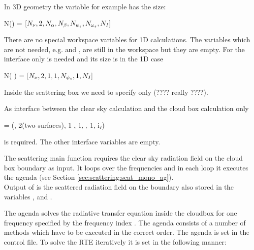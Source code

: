 In 3D geometry the variable   for example has the
size:
\begin{center}
  N() = $[N_{\nu}, 2, N_{\alpha}, N_{\beta}, N_{{\psi_s}},
  N_{{\omega_s}}, N_I]$
\end{center}  


There are no special workspace variables for 1D calculations. The
variables which are not needed, e.g.  and
, are still in the workspace but they are
empty. For the interface only  is needed and its
size is in the 1D case
\begin{center}
N(  ) = $[N_{\nu}, 2, 1, 1,  N_{{\psi_s}}, 1,  N_I]$
\end{center}  
Inside the scattering box we need to specify only  
 (???? really ????). 

As interface between the clear sky calculation and the cloud box calculation only 
  \begin{center}
   =  (\Frq, 2(two surfaces), 1 , 1, \ScaZa,
1, i$_I$)
\end{center}
is required. The other interface variables are empty. 

\label{sec:scattering:main_function}

The scattering main function  requires the clear sky radiation 
field on the cloud box boundary as input.
It loops over the frequencies and in each loop it executes the agenda 
(see Section \ref{sec:scattering:scat_mono_ag}).\\
Output of  is the scattered radiation field on the
boundary also stored in the variables ,
and .


\label{sec:scattering:scat_mono_ag}

The agenda  solves the radiative transfer
equation inside the cloudbox for one frequency specified
by the frequency index . 
The agenda consists of a number of methods which have to be executed in
the correct order.
The agenda is set in the control file. To solve the RTE iteratively it
is set in the following manner:

